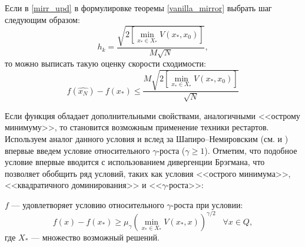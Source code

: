 \begin{remark}
    Если в \eqref{mirr_upd} в формулировке теоремы \ref{vanilla_mirror} выбрать шаг следующим образом:
    \begin{equation} \label{mirr_step}
        h_{k} = \frac{\sqrt{2 \left[\min\limits_{x_* \in X_*}{V(x_*, x_0)}\right] }}{M\sqrt{N}},
    \end{equation}
    то можно выписать такую оценку скорости сходимости:
    \begin{equation} \label{mirr_est}
        f(\widehat{x_N}) - f(x_*) \leq \frac{M\sqrt{2 \left[\min\limits_{x_* \in X_*}{V(x_*, x_0)}\right]}}{\sqrt{N}}
    \end{equation}
\end{remark}
Если функция обладает дополнительными свойствами, аналогичными <<острому минимуму>>,  то становится возможным применение техники рестартов. Используем аналог данного условия и вслед за Шапиро–Немировским (см. \cite{shapiro_2005} и \cite{shapiro_2021} ) впервые введем условие относительного $\gamma$-роста ($\gamma \geq 1$). Отметим, что подобное условие впервые вводится с использованием дивергенции Брэгмана, что позволяет обобщить ряд условий, таких как условия <<острого минимума>>, <<квадратичного доминирования>> и <<$\gamma$-роста>>:
\begin{definition}
   $f$ --- удовлетворяет условию относительного $\gamma$-роста при условии:
   \begin{equation} \label{gamma-growth}
       f(x) - f(x_*) \geq \mu_{\gamma}\left(\min_{x_* \in X_*}{V(x_*,x)}\right)^{\gamma/2} \;\;\; \forall x \in Q,
   \end{equation}
   где $X_*$ --- множество возможный решений.  
\end{definition}

